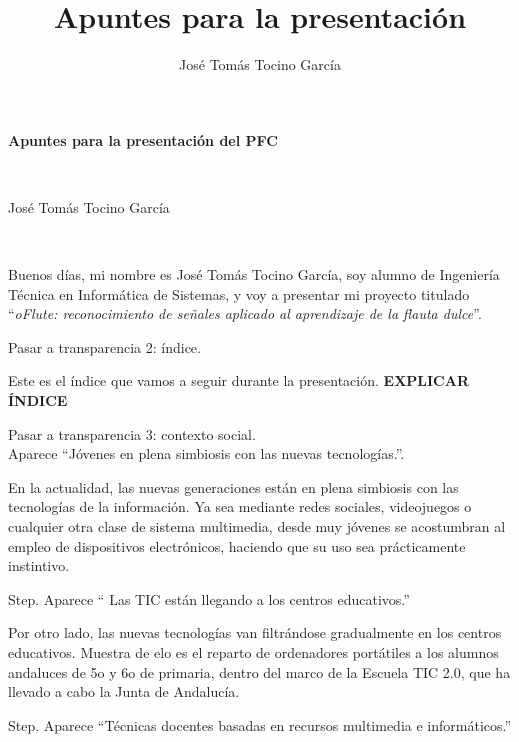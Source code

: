 \documentclass[landscape]{article}
\title{Apuntes para la presentación}
\author{José Tomás Tocino García}
\date{}
\newenvironment{nota}
{%
\begin{framed} \noindent\itshape
}
{%
\end{framed}\vspace{-0.5cm} }
\begin{document}
\pagestyle{empty}
\begin{multicols*}{2}

\begin{center}
  \begin{Large}\textbf{Apuntes para la presentación del PFC}\end{Large}\\
  \begin{large}José Tomás Tocino García\end{large}\\[0.1cm]
\end{center}

Buenos días, mi nombre es José Tomás Tocino García, soy alumno de Ingeniería
Técnica en Informática de Sistemas, y voy a presentar mi proyecto titulado
``\textit{oFlute: reconocimiento de señales aplicado al aprendizaje de la flauta
  dulce}''.

\begin{nota}
  Pasar a transparencia 2: índice.
\end{nota}

Este es el índice que vamos a seguir durante la presentación. \textbf{EXPLICAR
  ÍNDICE}

\begin{nota}
  Pasar a transparencia 3: contexto social. \\Aparece ``Jóvenes en plena simbiosis con
  las nuevas tecnologías.''.
\end{nota}

En la actualidad, las nuevas generaciones están en plena simbiosis con las
tecnologías de la información. Ya sea mediante redes sociales, videojuegos o
cualquier otra clase de sistema multimedia, desde muy jóvenes se acostumbran al
empleo de dispositivos electrónicos, haciendo que su uso sea prácticamente
instintivo.

\begin{nota}
  Step. Aparece `` Las TIC están llegando a los centros educativos.''
\end{nota}

Por otro lado, las nuevas tecnologías van filtrándose gradualmente en los
centros educativos. Muestra de elo es el reparto de ordenadores portátiles a los
alumnos andaluces de 5o y 6o de primaria, dentro del marco de la Escuela TIC
2.0, que ha llevado a cabo la Junta de Andalucía.

\begin{nota}
  Step. Aparece ``Técnicas docentes basadas en recursos multimedia e informáticos.''
\end{nota}


\end{multicols*}
\end{document}
